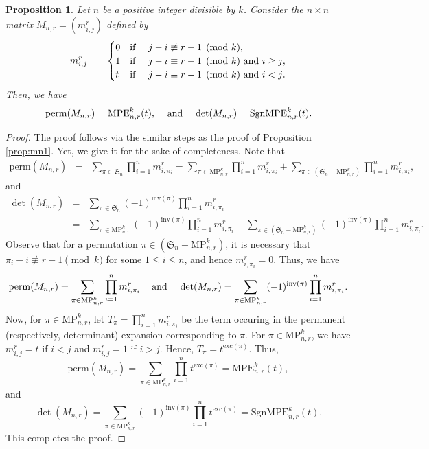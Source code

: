 \documentclass[12pt]{article}
\newcommand{\Perm}{\mathrm{perm}}
\newcommand{\MP}{\mathrm{MP}}
\newcommand{\MPE}{\mathrm{MPE}}
\newcommand{\SMPE}{\mathrm{SgnMPE}}
\newcommand{\SSS}{\mathfrak{S}}
\newcommand{\inv}{\mathrm{inv}}
\newcommand{\exc}{\mathrm{exc}}
\newtheorem{proposition}[lemma]{\bf Proposition}
\begin{document}
\begin{proposition}
\label{prop:gen-mnr}
Let $n$ be a positive integer divisible by $k$.  Consider the $n \times n$ matrix $M_{n, r}= (m^r_{i, j})$ defined by
\begin{eqnarray*}
m_{i,j}^r & = & \begin{cases}
0 & \text {if \quad $j-i   \not \equiv r-1 \pmod k $}, \\
1 & \text {if \quad $j-i  \equiv r-1 \pmod k$ and $i \geq j$},\\
 t & \text {if \quad $j-i  \equiv r-1 \pmod k$ and $i < j$}. 
 \end{cases}
\end{eqnarray*} 
Then, we have
\[\Perm(M_{n,r})=\MPE_{n,r}^k(t), \hspace{3 mm}  
\mbox{ and } 
\hspace{3 mm}
\det(M_{n,r})=\SMPE_{n,r}^k(t).\]
\end{proposition}

\begin{proof}
The proof follows via the similar steps as the proof of Proposition \ref{prop:mn1}. Yet, we give it for the sake of completeness. Note that
  \begin{eqnarray*}
  \Perm(M_{n,r}) & = & \displaystyle  \sum _{\pi \in \SSS_n}  \prod _{i=1}^n m^r_{i,\pi_i} = \displaystyle  \sum _{\pi \in \MP_{n,r}^k}  \prod _{i=1}^n m^r_{i,\pi_i} + \displaystyle  \sum _{\pi \in (\SSS_n - \MP_{n,r}^k)}  \prod _{i=1}^n m^r_{i,\pi_i},
  \end{eqnarray*}
  and
  \begin{eqnarray*}
  \det(M_{n,r}) & = & \displaystyle  \sum _{\pi \in \SSS_n} (-1)^{\inv(\pi)} \prod _{i=1}^n m^r_{i,\pi_i} \\
  & = & \displaystyle  \sum _{\pi \in \MP_{n,r}^k} (-1)^{\inv(\pi)} \prod _{i=1}^n m^r_{i,\pi_i} + \displaystyle  \sum _{\pi \in (\SSS_n - \MP_{n,r}^k)} (-1)^{\inv(\pi)} \prod _{i=1}^n m^r_{i,\pi_i}. 
  \end{eqnarray*}
 Observe that for a permutation $\pi \in (\SSS_n- \MP_{n,r}^k)$, it is necessary that $\pi_i-i \not \equiv r-1 \pmod k$ for some $1 \leq i \leq n$, and hence $m^r_{i,\pi_i}=0$. Thus, we have
\[ \Perm(M_{n,r}) =  \displaystyle  \sum _{\pi \in \MP_{n,r}^k}  \prod _{i=1}^n m^r_{i,\pi_i} \hspace{3 mm} \mbox{ and } \hspace{3 mm} \det(M_{n,r}) =  \displaystyle  \sum _{\pi \in \MP_{n,r}^k} (-1)^{\inv(\pi)} \prod _{i=1}^n m^r_{i,\pi_i}.\]
Now, for $\pi \in \MP_{n,r}^k$, let $T_{\pi} = \prod _{i=1}^n m^r_{i, \pi_i}$ be the term occuring in the permanent (respectively, determinant) expansion corresponding to $\pi$.
For $\pi \in \MP_{n,r}^k$, we have $m^r_{i,j}=t$ if $i < j$ and $m^r_{i,j}=1$ if $i > j$. Hence, $T_{\pi} = t^{\exc(\pi) }$. Thus, 
\[ \Perm(M_{n,r})= \displaystyle  \sum _{\pi \in \MP_{n,r}^k}  \prod _{i=1}^n t^{\exc(\pi)} = \MPE_{n,r}^k(t),\]
and 
\[ \det(M_{n,r}) =  \displaystyle  \sum _{\pi \in \MP_{n,r}^k} (-1)^{\inv(\pi)} \prod _{i=1}^n t^{\exc(\pi)} = \SMPE_{n,r}^k(t) .\] 
This completes the proof. 
\end{proof}
\end{document}

